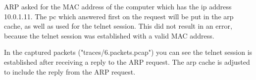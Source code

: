 ARP asked for the MAC address of the computer which has the ip address 10.0.1.11. The pc which answered first on the request will be put in the arp cache, as well as used for the telnet session. This did not result in an error, because the telnet session was established with a valid MAC address. \newline

In the captured packets ("traces/6.packets.pcap") you can see the telnet session is established after receiving a reply to the ARP request. The arp cache is adjusted to include the reply from the ARP request.\newline
